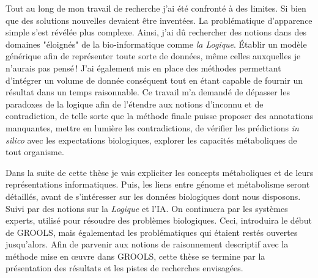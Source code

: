 \begin{refsegment}
Tout au long de mon travail de recherche j'ai été confronté à des limites. Si bien que des solutions nouvelles devaient être inventées. La problématique d'apparence simple s'est révélée plus complexe. Ainsi, j'ai dû rechercher des notions dans des domaines "éloignés" de la bio-informatique comme \textit{la Logique}. Établir un modèle générique afin de représenter toute sorte de données, même celles auxquelles je n'aurais pas pensé ! J'ai également mis en place des méthodes permettant d'intégrer un volume de donnée conséquent tout en étant capable de fournir un résultat dans un temps raisonnable. Ce travail m'a demandé de dépasser les paradoxes de la logique afin de l'étendre aux notions d'inconnu et de contradiction, de telle sorte que la méthode finale puisse proposer des annotations manquantes, mettre en lumière les contradictions, de vérifier les prédictions \textit{in silico} avec les expectations biologiques, explorer les capacités métaboliques de tout organisme.


Dans la suite de cette thèse je vais expliciter les concepts métaboliques et de leurs représentations informatiques. Puis, les liens entre génome et métabolisme seront détaillés, avant de s'intéresser sur les données biologiques dont nous disposons. Suivi par des notions sur la \textit{Logique} et l'\gls{IA}. On continuera par les systèmes experts, utilisé pour résoudre des problèmes biologiques. Ceci, introduira le début de \gls{GROOLS}, mais égalementad les problématiques qui étaient restés ouvertes jusqu'alors. Afin de parvenir aux notions de raisonnement descriptif avec la méthode mise en œuvre dans \gls{GROOLS}, cette thèse se termine par la présentation des résultats et les pistes de recherches envisagées.


\subbibliography
\end{refsegment}
